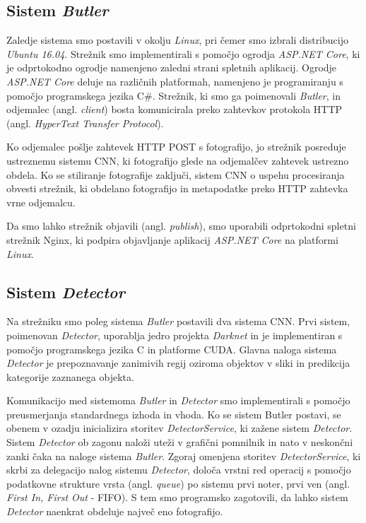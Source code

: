 \documentclass[runningheads,a4paper]{llncs}
\begin{document}
\subsection{Sistem \textit{Butler}}
Zaledje sistema smo postavili v okolju \textit{Linux}, pri čemer smo izbrali distribucijo \textit{Ubuntu 16.04}. Strežnik smo implementirali s pomočjo ogrodja \textit{ASP.NET Core}\cite{wiki:asp_net_core}, ki je odprtokodno ogrodje namenjeno zaledni strani spletnih aplikacij. Ogrodje \textit{ASP.NET Core} deluje na različnih platformah, namenjeno je programiranju s pomočjo programskega jezika C\#. Strežnik, ki smo ga poimenovali \textit{Butler}, in odjemalec (angl. \textit{client}) bosta komunicirala preko zahtevkov protokola HTTP (angl. \textit{HyperText Transfer Protocol}). 

Ko odjemalec pošlje zahtevek HTTP POST s fotografijo, jo strežnik posreduje ustreznemu sistemu CNN, ki fotografijo glede na odjemalčev zahtevek ustrezno obdela. Ko se stiliranje fotografije zaključi, sistem CNN o uspehu procesiranja obvesti strežnik, ki obdelano fotografijo in metapodatke preko HTTP zahtevka vrne odjemalcu.

Da smo lahko strežnik objavili (angl. \textit{publish}), smo uporabili odprtokodni spletni strežnik Nginx\cite{wiki:nginx}, ki podpira objavljanje aplikacij \textit{ASP.NET Core} na platformi \textit{Linux}.

\subsection{Sistem \textit{Detector}}
Na strežniku smo poleg sistema \textit{Butler} postavili dva sistema CNN. Prvi sistem, poimenovan \textit{Detector}, uporablja jedro projekta \textit{Darknet} in je implementiran s pomočjo programskega jezika C in platforme CUDA. Glavna naloga sistema \textit{Detector} je prepoznavanje zanimivih regij oziroma objektov v sliki in predikcija kategorije zaznanega objekta. 

Komunikacijo med sistemoma \textit{Butler} in \textit{Detector} smo implementirali s pomočjo preusmerjanja standardnega izhoda in vhoda. Ko se sistem Butler postavi, se obenem v ozadju inicializira storitev \textit{DetectorService}, ki zažene sistem \textit{Detector}. Sistem \textit{Detector} ob zagonu naloži uteži v grafični pomnilnik in nato v neskončni zanki čaka na naloge sistema \textit{Butler}. Zgoraj omenjena storitev \textit{DetectorService}, ki skrbi za delegacijo nalog sistemu \textit{Detector}, določa vrstni red operacij s pomočjo podatkovne strukture vrsta (angl. \textit{queue}) po sistemu prvi noter, prvi ven (angl. \textit{First In, First Out} - FIFO). S tem smo programsko zagotovili, da lahko sistem \textit{Detector} naenkrat obdeluje največ eno fotografijo.
\end{document}
